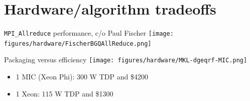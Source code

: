 \documentclass{beamer}
\begin{document}





\section{Hardware/algorithm tradeoffs}




\begin{frame}{\texttt{MPI\_Allreduce} performance, c/o Paul Fischer}
  \texttt{[image: figures/hardware/FischerBGQAllReduce.png]}
\end{frame}
\begin{frame}{Packaging versus efficiency}
  \texttt{[image: figures/hardware/MKL-dgeqrf-MIC.png]}
  \begin{itemize}
  \item 1 MIC (Xeon Phi): 300 W TDP and \$4200
  \item 1 Xeon: 115 W TDP and \$1300
  \end{itemize}
\end{frame}
\end{document}
